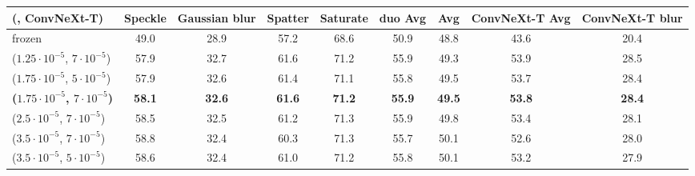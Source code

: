 \begin{tabular}{@{}l cccc cccc@{}}
\toprule
(\vit{}, ConvNeXt-T) & Speckle & Gaussian blur & Spatter & Saturate & duo Avg & \vit{} Avg & ConvNeXt-T Avg & ConvNeXt-T blur \\
\midrule
frozen & 49.0 & 28.9 & 57.2 & 68.6 & 50.9 & 48.8 & 43.6 & 20.4 \\
\midrule
($1.25{\cdot}10^{-5}$, $7{\cdot}10^{-5}$) & 57.9 & 32.7 & 61.6 & 71.2 & 55.9 & 49.3 & 53.9 & 28.5 \\
($1.75{\cdot}10^{-5}$, $5{\cdot}10^{-5}$) & 57.9 & 32.6 & 61.4 & 71.1 & 55.8 & 49.5 & 53.7 & 28.4 \\
\textbf{($1.75{\cdot}10^{-5}$, $7{\cdot}10^{-5}$)} & \textbf{58.1} & \textbf{32.6} & \textbf{61.6} & \textbf{71.2} & \textbf{55.9} & \textbf{49.5} & \textbf{53.8} & \textbf{28.4} \\
($2.5{\cdot}10^{-5}$, $7{\cdot}10^{-5}$) & 58.5 & 32.5 & 61.2 & 71.3 & 55.9 & 49.8 & 53.4 & 28.1 \\
($3.5{\cdot}10^{-5}$, $7{\cdot}10^{-5}$) & 58.8 & 32.4 & 60.3 & 71.3 & 55.7 & 50.1 & 52.6 & 28.0 \\
($3.5{\cdot}10^{-5}$, $5{\cdot}10^{-5}$) & 58.6 & 32.4 & 61.0 & 71.2 & 55.8 & 50.1 & 53.2 & 27.9 \\
\bottomrule
\end{tabular}
